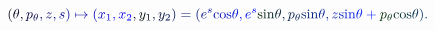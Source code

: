 \documentclass[12pt]{article}
\begin{document}
\makeatletter
\renewcommand*{\@textcolor}[3]{%
  \protect\leavevmode
  \begingroup
    \color#1{#2}#3%
  \endgroup
}
\makeatother
\begin{displaymath}
\mathcolor[RGB]{0,0,15}{(} \mathcolor[RGB]{0,0,30}{\theta} \mathcolor[RGB]{0,0,45}{,} \mathcolor[RGB]{0,0,60}{p} _ { \mathcolor[RGB]{0,0,75}{\theta} } \mathcolor[RGB]{0,0,90}{,} \mathcolor[RGB]{0,0,105}{z} \mathcolor[RGB]{0,0,120}{,} \mathcolor[RGB]{0,0,135}{s} \mathcolor[RGB]{0,0,150}{)} \mathcolor[RGB]{0,0,165}{\mapsto} \mathcolor[RGB]{0,0,180}{(} \mathcolor[RGB]{0,0,195}{x} _ { \mathcolor[RGB]{0,0,210}{1} } \mathcolor[RGB]{0,0,225}{,} \mathcolor[RGB]{0,0,240}{x} _ { \mathcolor[RGB]{0,0,255}{2} } \mathcolor[RGB]{0,15,0}{,} \mathcolor[RGB]{0,15,15}{y} _ { \mathcolor[RGB]{0,15,30}{1} } \mathcolor[RGB]{0,15,45}{,} \mathcolor[RGB]{0,15,60}{y} _ { \mathcolor[RGB]{0,15,75}{2} } \mathcolor[RGB]{0,15,90}{)} \mathcolor[RGB]{0,15,105}{=} \mathcolor[RGB]{0,15,120}{(} \mathcolor[RGB]{0,15,135}{e} ^ { \mathcolor[RGB]{0,15,150}{s} } \mathrm { \mathcolor[RGB]{0,15,165}{c} \mathcolor[RGB]{0,15,180}{o} \mathcolor[RGB]{0,15,195}{s} } \mathcolor[RGB]{0,15,210}{\theta} \mathcolor[RGB]{0,15,225}{,} \mathcolor[RGB]{0,15,240}{e} ^ { \mathcolor[RGB]{0,15,255}{s} } \mathrm { \mathcolor[RGB]{0,30,0}{s} \mathcolor[RGB]{0,30,15}{i} \mathcolor[RGB]{0,30,30}{n} } \mathcolor[RGB]{0,30,45}{\theta} \mathcolor[RGB]{0,30,60}{,} \mathcolor[RGB]{0,30,75}{p} _ { \mathcolor[RGB]{0,30,90}{\theta} } \mathrm { \mathcolor[RGB]{0,30,105}{s} \mathcolor[RGB]{0,30,120}{i} \mathcolor[RGB]{0,30,135}{n} } \mathcolor[RGB]{0,30,150}{\theta} \mathcolor[RGB]{0,30,165}{,} \mathcolor[RGB]{0,30,180}{z} \mathrm { \mathcolor[RGB]{0,30,195}{s} \mathcolor[RGB]{0,30,210}{i} \mathcolor[RGB]{0,30,225}{n} } \mathcolor[RGB]{0,30,240}{\theta} \mathcolor[RGB]{0,30,255}{+} \mathcolor[RGB]{0,45,0}{p} _ { \mathcolor[RGB]{0,45,15}{\theta} } \mathrm { \mathcolor[RGB]{0,45,30}{c} \mathcolor[RGB]{0,45,45}{o} \mathcolor[RGB]{0,45,60}{s} } \mathcolor[RGB]{0,45,75}{\theta} \mathcolor[RGB]{0,45,90}{)} \mathcolor[RGB]{0,45,105}{.}
\end{displaymath}
\end{document}

